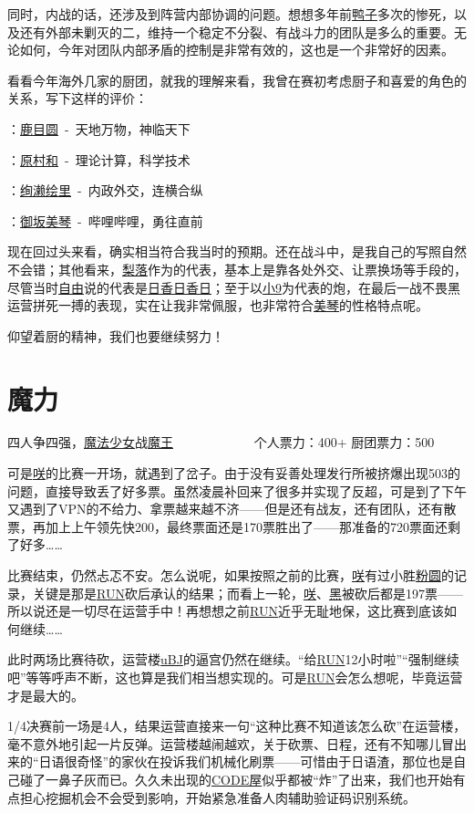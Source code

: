 同时，内战的话，还涉及到阵营内部协调的问题。想想多年前\uline{鸭子}多次的惨死，以及还有外部未剿灭的二，维持一个稳定不分裂、有战斗力的团队是多么的重要。无论如何，今年对团队内部矛盾的控制是非常有效的，这也是一个非常好的因素。

看看今年海外几家的厨团，就我的理解来看，我曾在赛初考虑厨子和喜爱的角色的关系，写下这样的评价：

：\uline{鹿目圆}~-~天地万物，神临天下

：\uline{原村和}~-~理论计算，科学技术

：\uline{绚濑绘里}~-~内政外交，连横合纵

：\uline{御坂美琴}~-~哔哩哔哩，勇往直前

现在回过头来看，确实相当符合我当时的预期。还在战斗中，是我自己的写照自然不会错；其他看来，\uline{梨落}作为的代表，基本上是靠各处外交、让票换场等手段的，尽管当时\uline{自由}说的代表是\uline{日香日香日}；至于以\uline{小9}为代表的炮，在最后一战不畏黑运营拼死一搏的表现，实在让我非常佩服，也非常符合\uline{美琴}的性格特点呢。

仰望着厨的精神，我们也要继续努力！

\chapter{魔力}
\begin{center}
{\subTitle 四人争四强，\uline{魔法少女}战\uline{魔王}}
\subMemo
　　　　　　个人票力：400+ 厨团票力：500
\end{center}

可是\uline{咲}的比赛一开场，就遇到了岔子。由于没有妥善处理发行所被挤爆出现503的问题，直接导致丢了好多票。虽然凌晨补回来了很多并实现了反超，可是到了下午又遇到了VPN的不给力、拿票越来越不济——但是还有战友，还有团队，还有散票，再加上上午领先快200，最终票面还是170票胜出了——那准备的720票面还剩了好多……

比赛结束，仍然忐忑不安。怎么说呢，如果按照之前的比赛，\uline{咲}有过小胜\uline{粉圆}的记录，关键是那是\uline{RUN}砍后承认的结果；而看上一轮，\uline{咲}、\uline{黑}被砍后都是197票——所以说还是一切尽在运营手中！再想想之前\uline{RUN}近乎无耻地保，这比赛到底该如何继续……

此时两场比赛待砍，运营楼\uline{uBJ}的逼宫仍然在继续。“给\uline{RUN}12小时啦”“强制继续吧”等等呼声不断，这也算是我们相当想实现的。可是\uline{RUN}会怎么想呢，毕竟运营才是最大的。

1/4决赛前一场是4人，结果运营直接来一句“这种比赛不知道该怎么砍”在运营楼，毫不意外地引起一片反弹。运营楼越闹越欢，关于砍票、日程，还有不知哪儿冒出来的“日语很奇怪”的家伙在投诉我们机械化刷票——可惜由于日语渣，那位也是自己碰了一鼻子灰而已。久久未出现的\uline{CODE屋}似乎都被“炸”了出来，我们也开始有点担心挖掘机会不会受到影响，开始紧急准备人肉辅助验证码识别系统。

